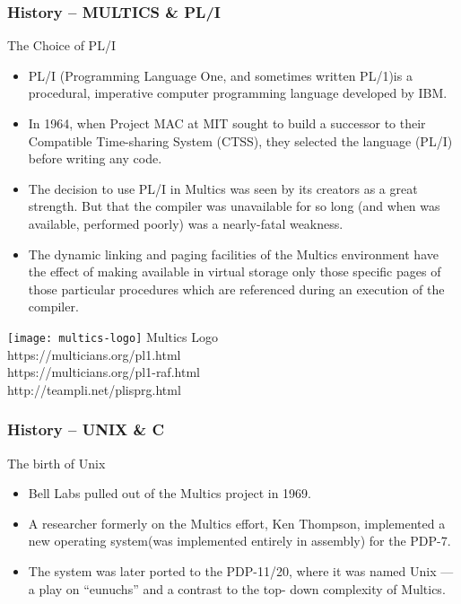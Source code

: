 \begin{frame}[plain]
	\frametitle{History -- MULTICS \& PL/I}
	
	The Choice of PL/I
    \begin{itemize}
		\item PL/I (Programming Language One, and sometimes written PL/1)is a procedural, imperative computer programming language developed by IBM.
		\item In 1964, when Project MAC at MIT sought to build a successor
		to their Compatible Time-sharing System (CTSS), they selected
		the language (PL/I) before writing any code.
		\item The decision to use PL/I in Multics was seen by its creators as a
		great strength. But that the compiler was unavailable for so long (and when
		was available, performed poorly) was a nearly-fatal weakness.
		\item The dynamic linking and paging facilities of the Multics environment have the effect of making available in virtual storage only those specific pages of those particular procedures which are referenced during an execution of the compiler. 
		
	
	\end{itemize}
	
	\texttt{[image: multics-logo]}
	\tiny Multics Logo \\ https://multicians.org/pl1.html \\ https://multicians.org/pl1-raf.html \\ http://teampli.net/plisprg.html
	
	
\end{frame}

\begin{frame}[plain]
	\frametitle{History -- UNIX \& C}
	
	The birth of Unix
	\begin{itemize}

		\item Bell Labs pulled out of the Multics project in 1969.
		
		\item A researcher formerly on the Multics effort, Ken Thompson,
		implemented a new operating system(was implemented entirely in assembly) for the PDP-7.
		\item The system was later ported to the PDP-11/20, where it was
		named Unix — a play on “eunuchs” and a contrast to the top-
		down complexity of Multics. 
		
		
		
	\end{itemize}
	
	
\end{frame}


